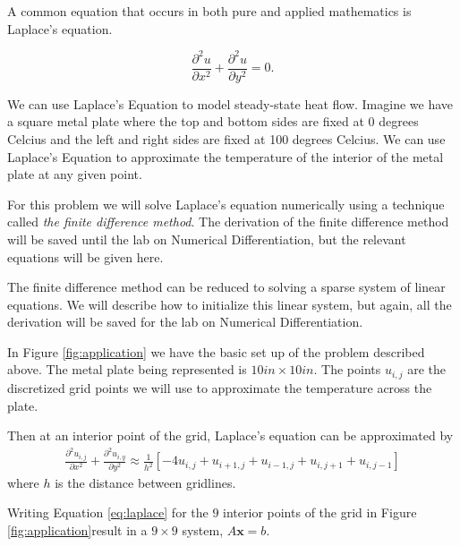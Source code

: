 \begin{problem}
A common equation that occurs in both pure and applied mathematics is Laplace's equation.

\[ \frac{\partial^2 u}{\partial x^2}+ \frac{\partial^2 u}{\partial y^2}= 0.\]

We can use Laplace's Equation to model steady-state heat flow. Imagine we have a square metal plate where the top and bottom sides are fixed at 0 degrees Celcius and the left and right sides are fixed at 100 degrees Celcius. We can use Laplace's Equation to approximate the temperature of the interior of the metal plate at any given point.

For this problem we will solve Laplace's equation numerically using a technique called \textit{the finite difference method}.  The derivation of the finite difference method will be saved until the lab on Numerical Differentiation, but the relevant equations will be given here.

The finite difference method can be reduced to solving a sparse system of linear equations. We will describe how to initialize this linear system, but again, all the derivation will be saved for the lab on Numerical Differentiation.

In Figure \ref{fig:application} we have the basic set up of the problem described above. The metal plate being represented is $10 in \times 10 in$. The points $u_{i,j}$ are the discretized grid points we will use to approximate the temperature across the plate.

Then at an interior point of the grid, Laplace's equation can be approximated by
\begin{equation} \label{eq:laplace}
\begin{split}
    \frac{\partial^2 u_{i,j}}{\partial x^2}+ \frac{\partial^2 u_{i,y}}{\partial y^2} \approx \frac{1}{h^2}\left[-4u_{i,j} + u_{i+1,j} + u_{i-1,j} + u_{i,j+1} +  u_{i,j-1}\right]
\end{split}
\end{equation}
where $h$ is the distance between gridlines.

Writing Equation \ref{eq:laplace} for the $9$ interior points of the grid in Figure \ref{fig:application}result in a $9 \times 9$ system, $A \mathbf{x} = b$.


\end{problem}

